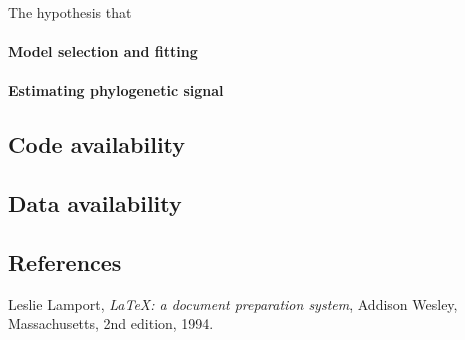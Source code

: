 \documentclass[twocolumn, linenumbers, superscriptaddress, nofootinbib]{revtex4-1}
\begin{document}
				The hypothesis that 
			
 
			\paragraph*{Model selection and fitting}
			
			\paragraph*{Estimating phylogenetic signal}
		
			
		\subsection*{Code availability}
			
		\subsection*{Data availability}

	\begin{thebibliography}{50}
		\section*{References}	
				Leslie Lamport,
				\textit{\LaTeX: a document preparation system},
				Addison Wesley, Massachusetts,
				2nd edition,
				1994.

	\end{thebibliography}
\end{document}
